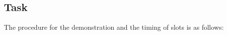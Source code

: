 



\subsection{Task}
The procedure for the demonstration and the timing of slots is as follows:

\OpenDemonstrationChanges








